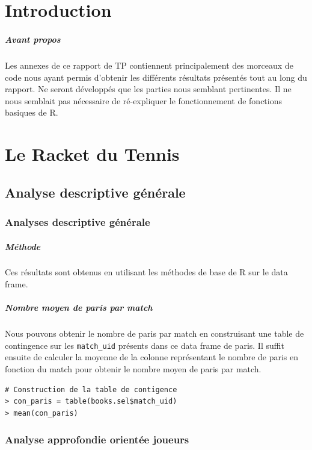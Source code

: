 \documentclass{report}
\begin{document}
\newpage
\begin{appendices}
\chapter{Introduction}
\paragraph{Avant propos}
Les annexes de ce rapport de TP contiennent principalement des morceaux de code nous ayant permis d'obtenir les différents résultats présentés tout au long du rapport. Ne seront développés que les parties nous semblant pertinentes. Il ne nous semblait pas nécessaire de ré-expliquer le fonctionnement de fonctions basiques de R.

\chapter{Le Racket du Tennis}
\section{Analyse descriptive générale}
\subsection{Analyses descriptive générale} %
\paragraph{Méthode}
Ces résultats sont obtenus en utilisant les méthodes de base de R sur le data
frame.
\paragraph{Nombre moyen de paris par match}
Nous pouvons obtenir le nombre de paris par match en construisant une table de
contingence sur les \verb+match_uid+ présents dans ce data frame de paris. Il
suffit ensuite de calculer la moyenne de la colonne représentant le nombre de
paris en fonction du match pour obtenir le nombre moyen de paris par match.
\begin{lstlisting}
# Construction de la table de contigence
> con_paris = table(books.sel$match_uid)
> mean(con_paris)
\end{lstlisting} %

\subsection{Analyse approfondie orientée joueurs} %

\end{appendices}
\end{document}
